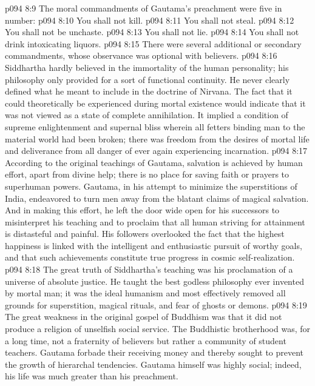\pc \vs p094 8:9 The moral commandments of Gautama’s preachment were five in number:
\pc \vs p094 8:10 \bibnobreakspace You shall not kill.
\vs p094 8:11 \bibnobreakspace You shall not steal.
\vs p094 8:12 \bibnobreakspace You shall not be unchaste.
\vs p094 8:13 \bibnobreakspace You shall not lie.
\vs p094 8:14 \bibnobreakspace You shall not drink intoxicating liquors.
\pc \vs p094 8:15 There were several additional or secondary commandments, whose observance was optional with believers.
\pc \vs p094 8:16 Siddhartha hardly believed in the immortality of the human personality; his philosophy only provided for a sort of functional continuity. He never clearly defined what he meant to include in the doctrine of Nirvana. The fact that it could theoretically be experienced during mortal existence would indicate that it was not viewed as a state of complete annihilation. It implied a condition of supreme enlightenment and supernal bliss wherein all fetters binding man to the material world had been broken; there was freedom from the desires of mortal life and deliverance from all danger of ever again experiencing incarnation.
\vs p094 8:17 According to the original teachings of Gautama, salvation is achieved by human effort, apart from divine help; there is no place for saving faith or prayers to superhuman powers. Gautama, in his attempt to minimize the superstitions of India, endeavored to turn men away from the blatant claims of magical salvation. And in making this effort, he left the door wide open for his successors to misinterpret his teaching and to proclaim that all human striving for attainment is distasteful and painful. His followers overlooked the fact that the highest happiness is linked with the intelligent and enthusiastic pursuit of worthy goals, and that such achievements constitute true progress in cosmic self\hyp{}realization.\plusone
\vs p094 8:18 The great truth of Siddhartha’s teaching was his proclamation of a universe of absolute justice. He taught the best godless philosophy ever invented by mortal man; it was the ideal humanism and most effectively removed all grounds for superstition, magical rituals, and fear of ghosts or demons.
\vs p094 8:19 The great weakness in the original gospel of Buddhism was that it did not produce a religion of unselfish social service. The Buddhistic brotherhood was, for a long time, not a fraternity of believers but rather a community of student teachers. Gautama forbade their receiving money and thereby sought to prevent the growth of hierarchal tendencies. Gautama himself was highly social; indeed, his life was much greater than his preachment.
